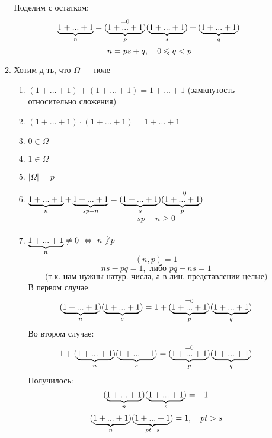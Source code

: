 \documentclass[main.tex]{subfiles}
\begin{document}
\begin{utv}
\begin{enumerate}
\begin{enumerate}
                        Поделим с остатком:
                        \[\ub{n}{1+...+1} = (\os{=0}{\ub{p}{1+...+1}})(\ub{s}{1+...+1})+(\ub{q}{1+...+1})\]
                        \[n = ps + q,\q 0 \leq q < p\]
                    \item Хотим д-ть, что $\Omega$ --- поле
                    \begin{enumerate}
                        \item $(1+...+1) + (1+...+1) = 1+...+1$ (замкнутость относительно сложения)
                        \item $(1+...+1) \cdot (1+...+1) = 1+...+1$
                        \item $0 \in \Omega$
                        \item $1 \in \Omega$
                        \item $|\Omega| = p$
                        \item $\ub{n}{1+...+1} + \ub{sp-n}{1+...+1} = (\ub{s}{1+...+1})(\os{=0}{\ub{p}{1+...+1}})$
                        \[sp - n \geq 0\]
                        \item $\ub{n}{1+...+1} \neq 0\ \lra \ n \not \devides p$
                            \[(n,p) = 1\]
                            \[ns - pq = 1, \text{ либо } pq - ns = 1\]
                            \[\text{(т.к. нам нужны натур. числа, а в лин. представлении целые)}\]
                            В первом случае:
                            \[(\ub{n}{1+...+1})(\ub{s}{1+...+1}) = 1 + (\os{=0}{\ub{p}{1+...+1}})(\ub{q}{1+...+1})\]
                            Во втором случае:
                            \[1 + (\ub{n}{1+...+1})(\ub{s}{1+...+1}) = (\os{=0}{\ub{p}{1+...+1}})(\ub{q}{1+...+1})\]
                            Получилось:
                            \[(\ub{n}{1+...+1})(\ub{s}{1+...+1}) = -1\]
                            \[(\ub{n}{1+...+1})(\ub{pt-s}{1+...+1})=1,\q pt > s\]
                    \end{enumerate}
                \end{enumerate}
        \end{enumerate}
    \end{utv}
\end{document}
